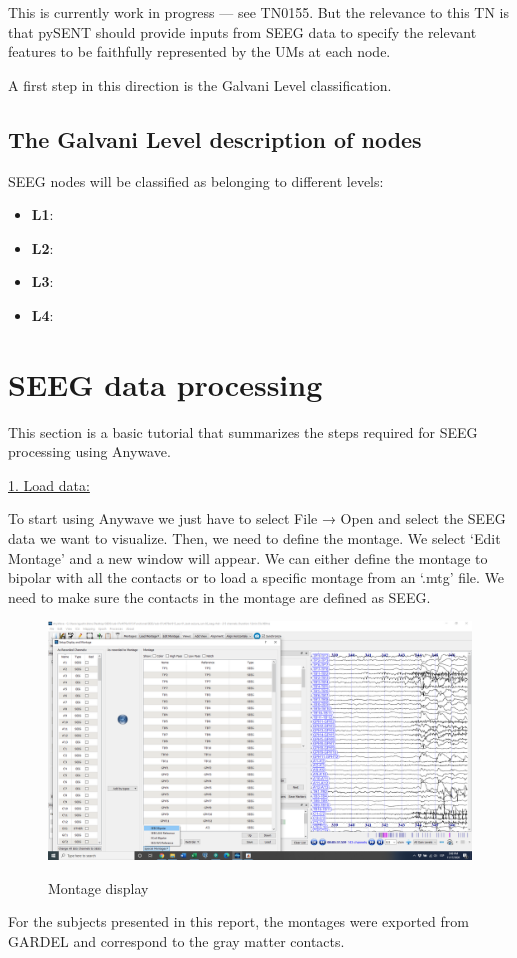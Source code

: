 \documentclass[11pt,oneside]{amsart}
\begin{document}
 This is currently work in progress --- see TN0155. But the relevance to this TN is that pySENT should provide inputs from SEEG data to specify the relevant features to be faithfully represented by the UMs at each node.
 
 A first step in this direction is the Galvani Level classification.
 
 
 \subsection{The Galvani Level description of nodes}
SEEG nodes will be classified as belonging to different levels:
\begin{itemize}
    \item {\bf L1}: 
    \item {\bf L2}:
    \item {\bf L3}:
    \item {\bf L4}:
\end{itemize}


 \section{SEEG data processing}
This section is a basic tutorial that summarizes the steps required for SEEG processing using Anywave. 

\underline{1. Load data:} 

To start using Anywave we just have to select File → Open and select the SEEG data we want to visualize. 
Then, we need to define the montage. We select ‘Edit Montage’ and a new window will appear. We can either define the montage to bipolar with all the contacts or to load a specific montage from an ‘.mtg’ file. We need to make sure the contacts in the montage are defined as SEEG.

\begin{figure}[H] \hspace{-0cm} \centering \hspace{0cm} \includegraphics[width=12cm,angle=0]{figures/montage.png} \label{fig:1}
    \caption{Montage display} 
\end{figure}
For the subjects presented in this report, the montages were exported from GARDEL and correspond to the gray matter contacts.
\end{document}
